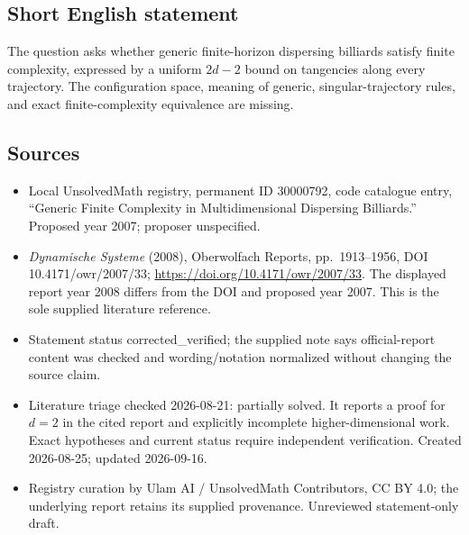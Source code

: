 \documentclass[11pt]{article}
\begin{document}
\subsection{Short English statement}
The question asks whether generic finite-horizon dispersing billiards satisfy finite complexity, expressed by a uniform $2d-2$ bound on tangencies along every trajectory. The configuration space, meaning of generic, singular-trajectory rules, and exact finite-complexity equivalence are missing.
\subsection{Sources}
\begin{itemize}
\item Local UnsolvedMath registry, permanent ID 30000792, code catalogue entry, ``Generic Finite Complexity in Multidimensional Dispersing Billiards.'' Proposed year 2007; proposer unspecified.
\item \emph{Dynamische Systeme} (2008), Oberwolfach Reports, pp.\ 1913--1956, DOI 10.4171/owr/2007/33; \url{https://doi.org/10.4171/owr/2007/33}. The displayed report year 2008 differs from the DOI and proposed year 2007. This is the sole supplied literature reference.
\item Statement status corrected\_verified; the supplied note says official-report content was checked and wording/notation normalized without changing the source claim.
\item Literature triage checked 2026-08-21: partially solved. It reports a proof for $d=2$ in the cited report and explicitly incomplete higher-dimensional work. Exact hypotheses and current status require independent verification. Created 2026-08-25; updated 2026-09-16.
\item Registry curation by Ulam AI / UnsolvedMath Contributors, CC BY 4.0; the underlying report retains its supplied provenance. Unreviewed statement-only draft.
\end{itemize}
\end{document}
